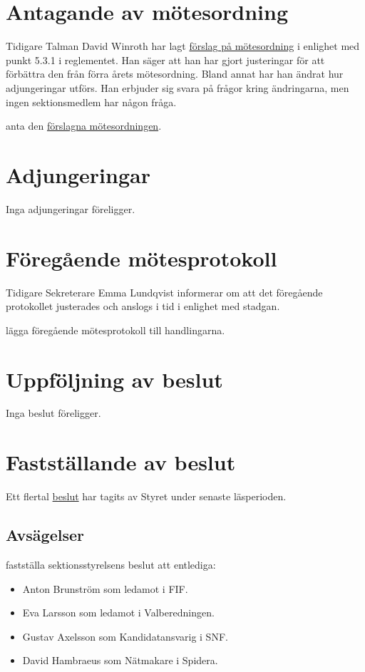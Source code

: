 \documentclass[hidelinks]{sektionsmote}
\begin{document}
\section{Antagande av mötesordning}
Tidigare Talman David Winroth har lagt \hyperlink{bilagor/motesordning.pdf.1}{förslag på mötesordning} i enlighet med punkt 5.3.1 i reglementet.
Han säger att han har gjort justeringar för att förbättra den från förra årets mötesordning.
Bland annat har han ändrat hur adjungeringar utförs.
Han erbjuder sig svara på frågor kring ändringarna, men ingen sektionsmedlem har någon fråga.
\begin{beslut}
    \item anta den \hyperlink{bilagor/motesordning.pdf.1}{förslagna mötesordningen}.
\end{beslut}

\section{Adjungeringar}
Inga adjungeringar föreligger.


\section{Föregående mötesprotokoll}
Tidigare Sekreterare Emma Lundqvist informerar om att det föregående protokollet justerades och anslogs i tid i enlighet med stadgan.
\begin{beslut}
    \item lägga föregående mötesprotokoll till handlingarna. 
\end{beslut}


\section{Uppföljning av beslut}
Inga beslut föreligger.


\section{Fastställande av beslut}
Ett flertal \hyperlink{bilagor/beslut.pdf.1}{beslut} har tagits av Styret under senaste läsperioden.

\subsection{Avsägelser}
\begin{beslut}
    \item fastställa sektionsstyrelsens beslut att entlediga:
    \begin{itemize}
        \item Anton Brunström som ledamot i FIF.
        \item Eva Larsson som ledamot i Valberedningen.
        \item Gustav Axelsson som Kandidatansvarig i SNF.
        \item David Hambraeus som Nätmakare i Spidera.
    \end{itemize}
\end{beslut}
\end{document}
